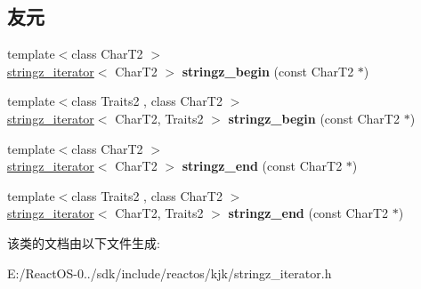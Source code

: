 \subsection*{友元}
\begin{DoxyCompactItemize}
\item 
\mbox{\label{classkjk_1_1stringz__iterator_a0a53a308d1f56489b29eea290ebabfd3}} 
{\footnotesize template$<$class Char\+T2 $>$ }\\\hyperlink{classkjk_1_1stringz__iterator}{stringz\+\_\+iterator}$<$ Char\+T2 $>$ {\bfseries stringz\+\_\+begin} (const Char\+T2 $\ast$)
\item 
\mbox{\label{classkjk_1_1stringz__iterator_ab9e34535c8379ae3f3a5d1b8d81a1460}} 
{\footnotesize template$<$class Traits2 , class Char\+T2 $>$ }\\\hyperlink{classkjk_1_1stringz__iterator}{stringz\+\_\+iterator}$<$ Char\+T2, Traits2 $>$ {\bfseries stringz\+\_\+begin} (const Char\+T2 $\ast$)
\item 
\mbox{\label{classkjk_1_1stringz__iterator_ac567fe04bc9f31d8642e0b193be91812}} 
{\footnotesize template$<$class Char\+T2 $>$ }\\\hyperlink{classkjk_1_1stringz__iterator}{stringz\+\_\+iterator}$<$ Char\+T2 $>$ {\bfseries stringz\+\_\+end} (const Char\+T2 $\ast$)
\item 
\mbox{\label{classkjk_1_1stringz__iterator_a00ef2b38b0355d923ef7bf3e6d550270}} 
{\footnotesize template$<$class Traits2 , class Char\+T2 $>$ }\\\hyperlink{classkjk_1_1stringz__iterator}{stringz\+\_\+iterator}$<$ Char\+T2, Traits2 $>$ {\bfseries stringz\+\_\+end} (const Char\+T2 $\ast$)
\end{DoxyCompactItemize}


该类的文档由以下文件生成\+:\begin{DoxyCompactItemize}
\item 
E\+:/\+React\+O\+S-\/0../sdk/include/reactos/kjk/stringz\+\_\+iterator.\+h\end{DoxyCompactItemize}
